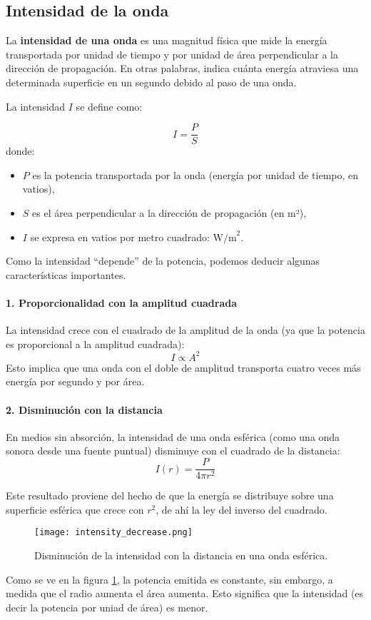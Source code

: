 \subsection{Intensidad de la onda}

La \textbf{intensidad de una onda} es una magnitud física que mide la energía transportada por unidad de tiempo y por unidad de área perpendicular a la dirección de propagación. En otras palabras, indica cuánta energía atraviesa una determinada superficie en un segundo debido al paso de una onda.

La intensidad \(I\) se define como:

\[
I = \frac{P}{S}
\]
donde:
\begin{itemize}
  \item \(P\) es la potencia transportada por la onda (energía por unidad de tiempo, en vatios),
  \item \(S\) es el área perpendicular a la dirección de propagación (en m²),
  \item \(I\) se expresa en vatios por metro cuadrado: \(\text{W/m}^2\).
\end{itemize}

Como la intensidad ``depende'' de la potencia, podemos deducir algunas características importantes. 

\paragraph{1. Proporcionalidad con la amplitud cuadrada}

La intensidad crece con el cuadrado de la amplitud de la onda (ya que la potencia es proporcional a la amplitud cuadrada):
\[
I \propto A^2
\]
Esto implica que una onda con el doble de amplitud transporta cuatro veces más energía por segundo y por área.

\paragraph{2. Disminución con la distancia}

En medios sin absorción, la intensidad de una onda esférica (como una onda sonora desde una fuente puntual) disminuye con el cuadrado de la distancia:
\[
I(r) = \frac{P}{4\pi r^2}
\]

Este resultado proviene del hecho de que la energía se distribuye sobre una superficie esférica que crece con \(r^2\), de ahí la ley del inverso del cuadrado.
\begin{figure}[ht]
  \centering
  \texttt{[image: intensity\_decrease.png]}
  \caption{Disminución de la intensidad con la distancia en una onda esférica.}
  \label{fig:intensity_decrease}
\end{figure}
Como se ve en la figura \ref{fig:intensity_decrease}, la potencia emitida es constante, sin embargo, a medida que el radio aumenta el área aumenta. Esto significa que la intensidad (es decir la potencia por uniad de área) es menor.

